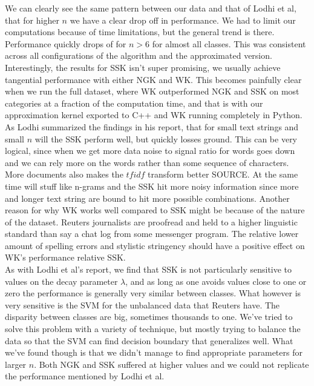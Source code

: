 We can clearly see the same pattern between our data and that of Lodhi et al, that for higher $ n $ we have a clear drop off in performance. We had to limit our computations because of time limitations, but the general trend is there. Performance quickly drops of for $ n>6 $ for almost all classes. This was consistent across all configurations of the algorithm and the approximated version. Interestingly, the results for SSK isn't super promising, we usually achieve tangential performance with either NGK and WK. This becomes painfully clear when we run the full dataset, where WK outperformed NGK and SSK on most categories at a fraction of the computation time, and that is with our approximation kernel exported to C++ and WK running completely in Python. As Lodhi summarized the findings in his report, that for small text strings and small $ n $ will the SSK perform well, but quickly losses ground. This can be very logical, since when we get more data noise to signal ratio for words goes down and we can rely more on the words rather than some sequence of characters. More documents also makes the $ tfidf $ transform better SOURCE. At the same time will stuff like n-grams and the SSK hit more noisy information since more and longer text string are bound to hit more possible combinations. Another reason for why WK works well compared to SSK might be because of the nature of the dataset. Reuters journalists are proofread and held to a higher linguistic standard than say a chat log from some messenger program. The relative lower amount of spelling errors and stylistic stringency should have a positive effect on WK's performance relative SSK.
\\
As with Lodhi et al's report, we find that SSK is not particularly sensitive to values on the decay parameter $ \lambda $, and as long as one avoids values close to one or zero the performance is generally very similar between classes. What however is very sensitive is the SVM for the unbalanced data that Reuters have. The disparity between classes are big, sometimes thousands to one. We've tried to solve this problem with a variety of technique, but mostly trying to balance the data so that the SVM can find decision boundary that generalizes well. What we've found though is that we didn't manage to find appropriate parameters for larger $ n $. Both NGK and SSK suffered at higher values and we could not replicate the performance mentioned by Lodhi et al.  
\\

